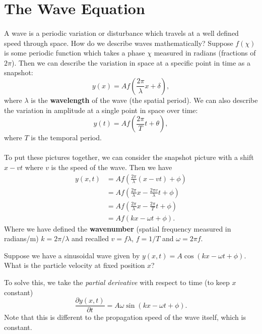 \documentclass[../newtonian_mechanics.tex]{subfiles}
\begin{document}
    \section{The Wave Equation}
        \paragraph{}
        A wave is a periodic variation or disturbance which travels at a well defined speed through space.
        How do we describe waves mathematically?
        Suppose $f(\chi)$ is some periodic function which takes a phase $\chi$ measured in radians (fractions of $2\pi$).
        Then we can describe the variation in space at a specific point in time as a snapshot:
        \begin{equation}
            y(x) = A f\left(\frac{2\pi}{\lambda}x+\delta\right),
        \end{equation}
        where $\lambda$ is the \textbf{wavelength} of the wave (the spatial period).
        We can also describe the variation in amplitude at a single point in space over time:
        \begin{equation}
            y(t)=A f\left(\frac{2\pi}{T}t+\theta\right),
        \end{equation}
        where $T$ is the temporal period.

        \paragraph{}
        To put these pictures together, we can consider the snapshot picture with a shift $x-vt$ where $v$ is the speed of the wave.
        Then we have
        \begin{align}
            y(x, t) &= A f\left(\frac{2\pi}{\lambda}(x-vt) + \phi\right)\\
            &= A f\left(\frac{2\pi}{\lambda}x - \frac{2\pi v}{\lambda}t + \phi\right)\\
            &= A f\left(\frac{2\pi}{\lambda}x - \frac{2\pi}{T}t + \phi\right)\\
            &= A f(kx - \omega t + \phi).
        \end{align} 
        Where we have defined the \textbf{wavenumber} (spatial frequency measured in radians/m) $k=2\pi/\lambda$ and recalled $v=f\lambda$, $f=1/T$ and $\omega=2\pi f$.
        \begin{example}
            Suppose we have a sinusoidal wave given by $y(x, t)=A\cos(kx-\omega t+\phi)$.
            What is the particle velocity at fixed position $x$?

            To solve this, we take the \textit{partial derivative} with respect to time (to keep $x$ constant)
            \begin{equation}
                \frac{\partial y(x, t)}{\partial t}=A\omega\sin(kx-\omega t+\phi).
            \end{equation}
            Note that this is different to the propagation speed of the wave itself, which is constant.
        \end{example}
\end{document}
